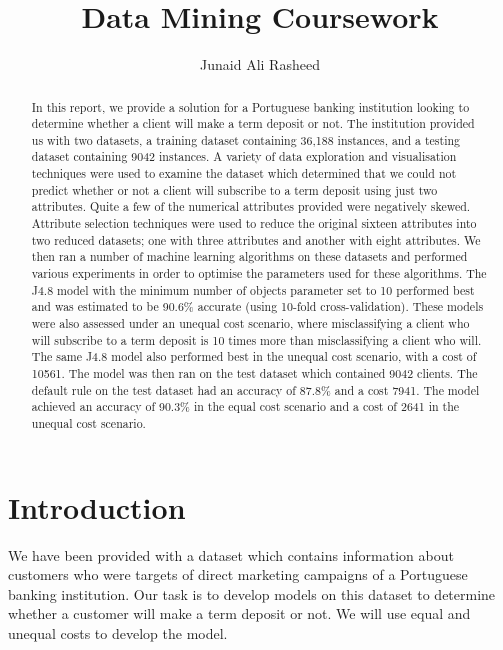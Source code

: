 \documentclass[a4paper,11pt]{article}
\title{Data Mining Coursework}
\author{Junaid Ali Rasheed}
\begin{document}
\maketitle

\begin{abstract}

\noindent In this report, we provide a solution for a Portuguese banking institution looking to determine whether
a client will make a term deposit or not. The institution provided us with two datasets, a training
dataset containing 36,188 instances, and a testing dataset containing 9042 instances. A variety
of data exploration and visualisation techniques were used to examine the dataset which determined
that we could not predict whether or not a client will subscribe to a term deposit using just two
attributes. Quite a few of the numerical attributes provided were negatively skewed. Attribute
selection techniques were used to reduce the original sixteen attributes into two reduced datasets;
one with three attributes and another with eight attributes. We then ran a number of machine learning
algorithms on these datasets and performed various experiments in order to optimise the parameters used
for these algorithms. The J4.8 model with the minimum number of objects parameter set to 10 performed best
and was estimated to be 90.6\% accurate (using 10-fold cross-validation). These models were also assessed
under an unequal cost scenario, where misclassifying a client who will subscribe to a term deposit is 10
times more than misclassifying a client who will. The same J4.8 model also performed best in the unequal
cost scenario, with a cost of 10561. The model was then ran on the test dataset which contained 9042
clients. The default rule on the test dataset had an accuracy of 87.8\% and a cost 7941. The model achieved
an accuracy of 90.3\% in the equal cost scenario and a cost of 2641 in the unequal cost scenario.

\end{abstract}

\section{Introduction}

We have been provided with a dataset which contains information about customers
who were targets of direct marketing campaigns of a Portuguese banking institution.
Our task is to develop models on this dataset to determine whether a customer
will make a term deposit or not. We will use equal and unequal costs to develop
the model.
\end{document}
